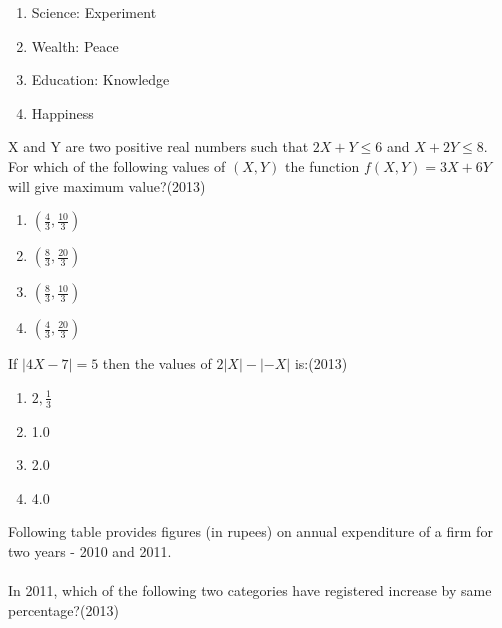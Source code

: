    \begin{multicols}{1}
			\begin{enumerate}
  \item Science: Experiment
\item Wealth: Peace
\item Education: Knowledge
\item Happiness 
\end{enumerate}
		\end{multicols}
		
\item   X and Y are two positive real numbers such that $2 X+Y \leq 6$ and $X+2 Y \leq 8$. For which of the following values of $(X, Y)$ the function $f(X, Y)=3 X+6 Y$ will give maximum value?(\hfill{2013})

\begin{multicols}{4}
			\begin{enumerate}

\item  $(\frac{4}  {3},\frac{10} { 3})$
\item $(\frac{8} {3},\frac{20} {3})$
\item $(\frac{8} {3},\frac{10}{ 3})$
\item $(\frac{4} { 3},\frac{20} { 3})$
   \end{enumerate}
		\end{multicols}
  \item  If $|4 X-7|=5$ then the values of $2|X|-|-X|$ is:(\hfill{2013})

  \begin{multicols}{4}
			\begin{enumerate}
   \item $2,\frac{1} {3}$
\item 1.0
\item  2.0
\item 4.0
 \end{enumerate}
		\end{multicols}
  \item Following table provides figures (in rupees) on annual expenditure of a firm for two years - 2010 and 2011.\\
\\In 2011, which of the following two categories have registered increase by same percentage?(\hfill{2013})

\begin{table}[h!]
	\centering
	
\end{table}
 

